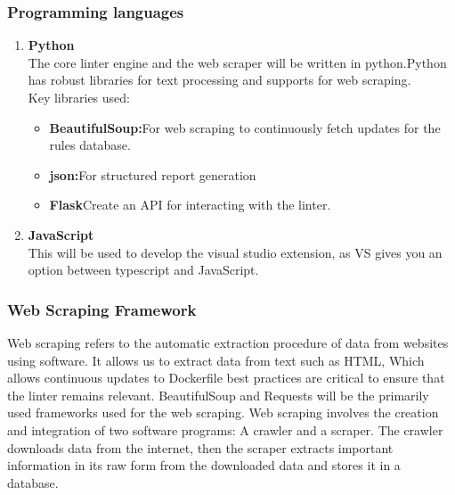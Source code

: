 \subsubsection{Programming languages}
\begin{enumerate}
    \item \textbf{Python}\\The core linter engine and the web scraper will be written in python.Python has robust libraries for text processing and supports for web scraping.\\Key libraries used: 
    \begin{itemize}
        \item \textbf{BeautifulSoup:}For web scraping to continuously fetch updates for the rules database.
        \item \textbf{json:}For structured report generation
        \item \textbf{Flask}Create an API for interacting with the linter.
    \end{itemize}
    \item \textbf{JavaScript}\\This will be used to develop the visual studio extension, as VS gives you an option between typescript and JavaScript.
\end{enumerate}
\subsubsection{Web Scraping Framework}
Web scraping refers to the automatic extraction procedure of data from websites using software. It allows us to extract data from text such as HTML, Which allows continuous updates to Dockerfile best practices are critical to ensure that the linter remains relevant.
BeautifulSoup and Requests will be the primarily used frameworks used for the web scraping.\cite{webscraping}
Web scraping involves the creation and integration of two software programs: A crawler and a scraper.
The crawler downloads data from the internet, then the scraper extracts important information in its raw form from the downloaded data and stores it in a database. \cite{webscraping}

